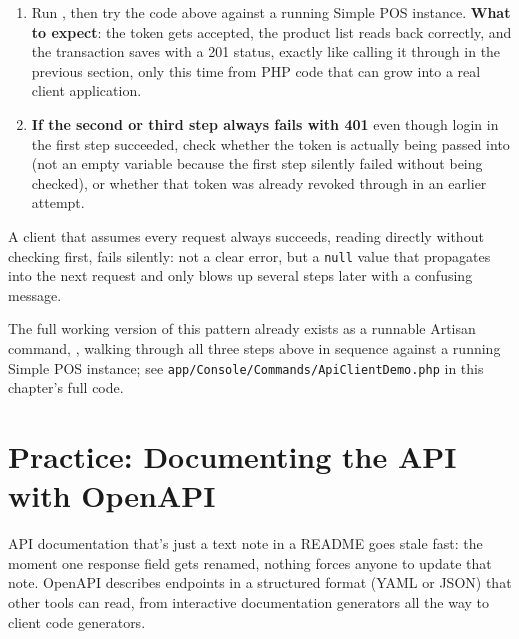 \begin{enumerate}
\begin{lstlisting}[language=php, title=\lstfile{app/Console/Commands/ApiClientDemo.php}]
match ($transaction->status()) {
    201 => /* transaction saved, read $transaction->json('data') */,
    401 => /* invalid token, log in again */,
    422 => /* input rejected, show $transaction->json('message') */,
    default => /* some other failure, surface it to the user */,
};
    \end{lstlisting}
  \item Run , then try the code above
    against a running Simple POS instance. \textbf{What to expect}:
    the token gets accepted, the product list reads back correctly,
    and the transaction saves with a 201 status, exactly like calling
    it through  in the previous section, only this time from
    PHP code that can grow into a real client application.
  \item \textbf{If the second or third step always fails with 401}
    even though login in the first step succeeded, check whether the
    token is actually being passed into  (not an
    empty variable because the first step silently failed without
    being checked), or whether that token was already revoked through
     in an earlier attempt.
\end{enumerate}

\begin{warningbox}
A client that assumes every request always succeeds, reading
 directly without checking
 first, fails silently: not a clear error, but a
\texttt{null} value that propagates into the next request and only
blows up several steps later with a confusing message.
\end{warningbox}

The full working version of this pattern already exists as a runnable
Artisan command, , walking through all three
steps above in sequence against a running Simple POS instance; see
\texttt{app/Console/Commands/ApiClientDemo.php} in this chapter's full
code.

\section{Practice: Documenting the API with OpenAPI}
\label{sec:membangun-rest-api-4}

API documentation that's just a text note in a README goes stale fast:
the moment one response field gets renamed, nothing forces anyone to
update that note. OpenAPI describes endpoints in a structured format
(YAML or JSON) that other tools can read, from interactive documentation
generators all the way to client code generators.

